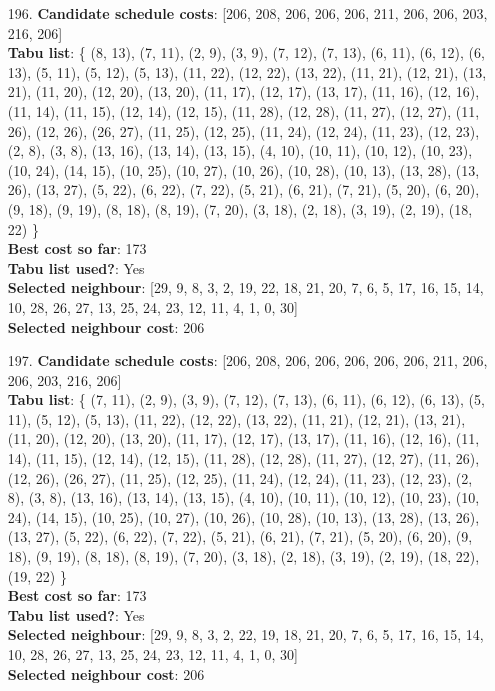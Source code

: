 \documentclass[fleqn]{article}
\begin{document}
\begin{itemize}
    \item[196.] \textbf{Candidate schedule costs}: [206, 208, 206, 206, 206, 211, 206, 206, 203, 216, 206] \\
    \textbf{Tabu list}: \{ (8, 13), (7, 11), (2, 9), (3, 9), (7, 12), (7, 13), (6, 11), (6, 12), (6, 13), (5, 11), (5, 12), (5, 13), (11, 22), (12, 22), (13, 22), (11, 21), (12, 21), (13, 21), (11, 20), (12, 20), (13, 20), (11, 17), (12, 17), (13, 17), (11, 16), (12, 16), (11, 14), (11, 15), (12, 14), (12, 15), (11, 28), (12, 28), (11, 27), (12, 27), (11, 26), (12, 26), (26, 27), (11, 25), (12, 25), (11, 24), (12, 24), (11, 23), (12, 23), (2, 8), (3, 8), (13, 16), (13, 14), (13, 15), (4, 10), (10, 11), (10, 12), (10, 23), (10, 24), (14, 15), (10, 25), (10, 27), (10, 26), (10, 28), (10, 13), (13, 28), (13, 26), (13, 27), (5, 22), (6, 22), (7, 22), (5, 21), (6, 21), (7, 21), (5, 20), (6, 20), (9, 18), (9, 19), (8, 18), (8, 19), (7, 20), (3, 18), (2, 18), (3, 19), (2, 19), (18, 22) \} \\
    \textbf{Best cost so far}: 173 \\
    \textbf{Tabu list used?}: Yes \\
    \textbf{Selected neighbour}: [29, 9, 8, 3, 2, 19, 22, 18, 21, 20, 7, 6, 5, 17, 16, 15, 14, 10, 28, 26, 27, 13, 25, 24, 23, 12, 11, 4, 1, 0, 30] \\
    \textbf{Selected neighbour cost}: 206
      

    \item[197.] \textbf{Candidate schedule costs}: [206, 208, 206, 206, 206, 206, 206, 211, 206, 206, 203, 216, 206] \\
    \textbf{Tabu list}: \{ (7, 11), (2, 9), (3, 9), (7, 12), (7, 13), (6, 11), (6, 12), (6, 13), (5, 11), (5, 12), (5, 13), (11, 22), (12, 22), (13, 22), (11, 21), (12, 21), (13, 21), (11, 20), (12, 20), (13, 20), (11, 17), (12, 17), (13, 17), (11, 16), (12, 16), (11, 14), (11, 15), (12, 14), (12, 15), (11, 28), (12, 28), (11, 27), (12, 27), (11, 26), (12, 26), (26, 27), (11, 25), (12, 25), (11, 24), (12, 24), (11, 23), (12, 23), (2, 8), (3, 8), (13, 16), (13, 14), (13, 15), (4, 10), (10, 11), (10, 12), (10, 23), (10, 24), (14, 15), (10, 25), (10, 27), (10, 26), (10, 28), (10, 13), (13, 28), (13, 26), (13, 27), (5, 22), (6, 22), (7, 22), (5, 21), (6, 21), (7, 21), (5, 20), (6, 20), (9, 18), (9, 19), (8, 18), (8, 19), (7, 20), (3, 18), (2, 18), (3, 19), (2, 19), (18, 22), (19, 22) \} \\
    \textbf{Best cost so far}: 173 \\
    \textbf{Tabu list used?}: Yes \\
    \textbf{Selected neighbour}: [29, 9, 8, 3, 2, 22, 19, 18, 21, 20, 7, 6, 5, 17, 16, 15, 14, 10, 28, 26, 27, 13, 25, 24, 23, 12, 11, 4, 1, 0, 30] \\
    \textbf{Selected neighbour cost}: 206
      


\end{itemize}
\end{document}
